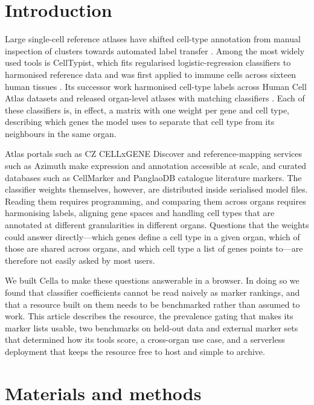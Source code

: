 \documentclass[11pt]{article}
\newcommand{\cella}{Cella}
\begin{document}
\section{Introduction}

Large single-cell reference atlases have shifted cell-type annotation from manual inspection of clusters towards automated label transfer \cite{regev2017,abdelaal2019}. Among the most widely used tools is CellTypist, which fits regularised logistic-regression classifiers to harmonised reference data and was first applied to immune cells across sixteen human tissues \cite{dominguez2022}. Its successor work harmonised cell-type labels across Human Cell Atlas datasets and released organ-level atlases with matching classifiers \cite{xu2023,celltypistorgans}. Each of these classifiers is, in effect, a matrix with one weight per gene and cell type, describing which genes the model uses to separate that cell type from its neighbours in the same organ.

Atlas portals such as CZ CELLxGENE Discover \cite{cellxgene2025} and reference-mapping services such as Azimuth \cite{hao2021} make expression and annotation accessible at scale, and curated databases such as CellMarker \cite{cellmarker2023} and PanglaoDB \cite{panglaodb2019} catalogue literature markers. The classifier weights themselves, however, are distributed inside serialised model files. Reading them requires programming, and comparing them across organs requires harmonising labels, aligning gene spaces and handling cell types that are annotated at different granularities in different organs. Questions that the weights could answer directly---which genes define a cell type in a given organ, which of those are shared across organs, and which cell type a list of genes points to---are therefore not easily asked by most users.

We built \cella{} to make these questions answerable in a browser. In doing so we found that classifier coefficients cannot be read naively as marker rankings, and that a resource built on them needs to be benchmarked rather than assumed to work. This article describes the resource, the prevalence gating that makes its marker lists usable, two benchmarks on held-out data and external marker sets that determined how its tools score, a cross-organ use case, and a serverless deployment that keeps the resource free to host and simple to archive.

\section{Materials and methods}
\end{document}
